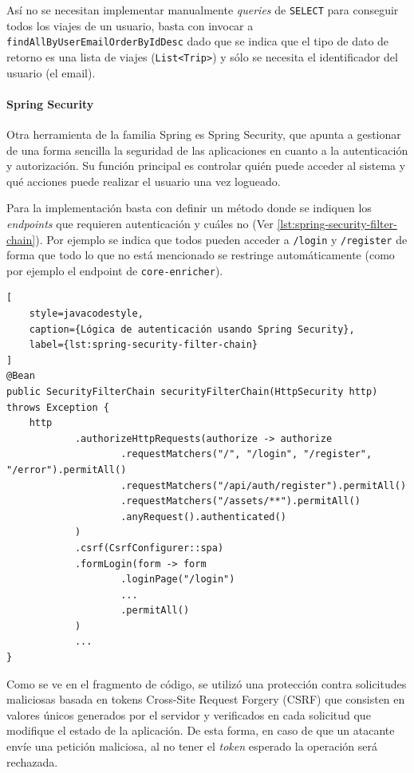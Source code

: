 Así no se necesitan implementar manualmente \textit{queries} de \texttt{SELECT} para conseguir todos los viajes de
un usuario, basta con invocar a \texttt{findAllByUserEmailOrderByIdDesc} dado que se indica que el tipo de dato de
retorno es una lista de viajes (\texttt{List<Trip>}) y sólo se necesita el identificador del usuario (el email).

\paragraph{Spring Security}

Otra herramienta de la familia Spring es Spring Security, que apunta a gestionar de una forma sencilla la seguridad
de las aplicaciones en cuanto a la autenticación y autorización.
Su función principal es controlar quién puede acceder al sistema y qué acciones puede realizar el usuario una vez
logueado.

Para la implementación basta con definir un método donde se indiquen los \textit{endpoints} que requieren autenticación
y cuáles no (Ver \autoref{lst:spring-security-filter-chain}). Por ejemplo se indica que todos pueden acceder a
\texttt{/login} y \texttt{/register} de forma que todo lo que no está mencionado se restringe automáticamente (como
por ejemplo el endpoint de \texttt{core-enricher}).

\begin{lstlisting}[
    style=javacodestyle,
    caption={Lógica de autenticación usando Spring Security},
    label={lst:spring-security-filter-chain}
]
@Bean
public SecurityFilterChain securityFilterChain(HttpSecurity http) throws Exception {
    http
            .authorizeHttpRequests(authorize -> authorize
                    .requestMatchers("/", "/login", "/register", "/error").permitAll()
                    .requestMatchers("/api/auth/register").permitAll()
                    .requestMatchers("/assets/**").permitAll()
                    .anyRequest().authenticated()
            )
            .csrf(CsrfConfigurer::spa)
            .formLogin(form -> form
                    .loginPage("/login")
                    ...
                    .permitAll()
            )
            ...
}
\end{lstlisting}

Como se ve en el fragmento de código, se utilizó una protección contra solicitudes maliciosas basada en tokens
Cross-Site Request Forgery (CSRF) que consisten en valores únicos generados por el servidor y verificados en cada
solicitud que modifique el estado de la aplicación.
De esta forma, en caso de que un atacante envíe una petición maliciosa, al no tener el \textit{token} esperado la operación será
rechazada.

